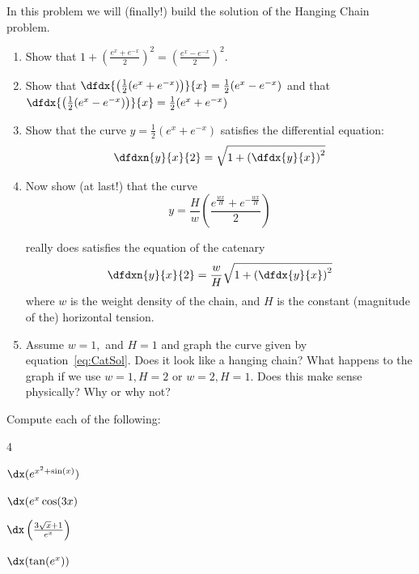\begin{embeddedproblem}{}
  In this problem we will (finally!) build the solution of the Hanging
  Chain problem. 
  \begin{enumerate}[label={\bf{}(\alph*)}]

  \item Show that
    $1+\left(\frac{e^x+e^{-x}}{2}\right)^2=\left(\frac{e^x-e^{-x}}{2}\right)^2.$\\
  \item Show that $
    \dfdx{
      \left(\frac{1}{2}(e^x+ e^{-x})\right)}{x}=
    \frac{1}{2}(e^x- e^{-x}) $ and that  $\dfdx{
      \left(\frac{1}{2}(e^x- e^{-x})\right)}{x}=
    \frac{1}{2}(e^x+ e^{-x})$
  \item Show that the curve $y=\frac12\left(e^x+e^{-x}\right)$ satisfies the
    differential equation:
    $$
    \dfdxn{y}{x}{2}=\sqrt{1+\left(\dfdx{y}{x}\right)^2}
    $$ 
  \item Now show (at last!) that the curve
    \begin{equation}
      y=\frac{H}{w}
      \left(\frac{e^{\frac{wx}{H}}+e^{-\frac{wx}{H}}}{2}\right)\label{eq:CatSol}
    \end{equation}

    really does satisfies the equation of the catenary
    $$
    \dfdxn{y}{x}{2}=\frac{w}{H} \sqrt{1+\left(\dfdx{y}{x}\right)^2}
    $$
    where $w$ is the weight density of the chain, and $H$ is the
    constant (magnitude of the) horizontal tension.
  \item   Assume $w=1,$ and  $H=1$ and graph the curve given by
    equation~\ref{eq:CatSol}.  Does it look like a hanging chain?
    What happens to the graph if we use $w=1, H=2$ or $w=2, H=1.$  Does this
    make sense physically?  Why or why not?
  \end{enumerate}

\end{embeddedproblem}

  \begin{embeddedproblem}{}
    Compute each of the following:
    \begin{enumerate}[label={\bf{}(\alph*)}]
      \begin{multicols}{4}
      \item $\dx(e^{x^2+\sin(x)})$
      \item $\dx(e^{x}\cos(3x)$
      \item $\dx
        \left(
          \frac{3\sqrt{x}+1}{e^x}
        \right)$
      \item $\dx(\tan(e^x))$

      \end{multicols}
    \end{enumerate}{}
  \end{embeddedproblem}


